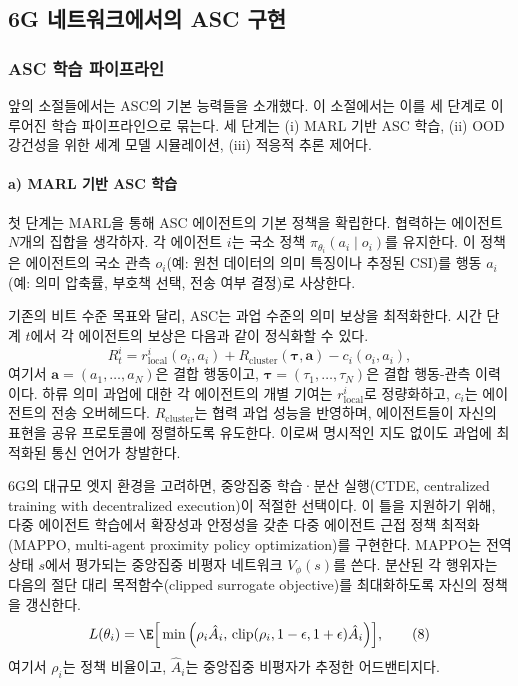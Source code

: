 \subsection{6G 네트워크에서의 ASC 구현}

\subsubsection{ASC 학습 파이프라인}
앞의 소절들에서는 ASC의 기본 능력들을 소개했다. 이 소절에서는 이를 세 단계로 이루어진 학습 파이프라인으로 묶는다. 세 단계는 (i) MARL 기반 ASC 학습, (ii) OOD 강건성을 위한 세계 모델 시뮬레이션, (iii) 적응적 추론 제어다.

\paragraph{a) MARL 기반 ASC 학습}
첫 단계는 MARL을 통해 ASC 에이전트의 기본 정책을 확립한다. 협력하는 에이전트 $N$개의 집합을 생각하자. 각 에이전트 $i$는 국소 정책 $\pi_{\theta_i}(a_i \mid o_i)$를 유지한다. 이 정책은 에이전트의 국소 관측 $o_i$(예: 원천 데이터의 의미 특징이나 추정된 CSI)를 행동 $a_i$(예: 의미 압축률, 부호책 선택, 전송 여부 결정)로 사상한다.

기존의 비트 수준 목표와 달리, ASC는 과업 수준의 의미 보상을 최적화한다. 시간 단계 $t$에서 각 에이전트의 보상은 다음과 같이 정식화할 수 있다.
\begin{equation}
R_t^i = r_{\mathrm{local}}^i(o_i, a_i) + R_{\mathrm{cluster}}(\bm{\tau}, \mathbf{a}) - c_i(o_i, a_i), \tag{7}
\end{equation}
여기서 $\mathbf{a} = (a_1, \ldots, a_N)$은 결합 행동이고, $\bm{\tau} = (\tau_1, \ldots, \tau_N)$은 결합 행동-관측 이력이다. 하류 의미 과업에 대한 각 에이전트의 개별 기여는 $r_{\mathrm{local}}^i$로 정량화하고, $c_i$는 에이전트의 전송 오버헤드다. $R_{\mathrm{cluster}}$는 협력 과업 성능을 반영하며, 에이전트들이 자신의 표현을 공유 프로토콜에 정렬하도록 유도한다. 이로써 명시적인 지도 없이도 과업에 최적화된 통신 언어가 창발한다.

6G의 대규모 엣지 환경을 고려하면, 중앙집중 학습·분산 실행(CTDE, centralized training with decentralized execution)이 적절한 선택이다. 이 틀을 지원하기 위해, 다중 에이전트 학습에서 확장성과 안정성을 갖춘 다중 에이전트 근접 정책 최적화(MAPPO, multi-agent proximity policy optimization)를 구현한다. MAPPO는 전역 상태 $s$에서 평가되는 중앙집중 비평자 네트워크 $V_\phi(s)$를 쓴다. 분산된 각 행위자는 다음의 절단 대리 목적함수(clipped surrogate objective)를 최대화하도록 자신의 정책을 갱신한다.
\begin{equation}
L(\theta_i) = \E\Big[\min\Big(\rho_i \hat{A}_i,\, \mathrm{clip}(\rho_i, 1-\epsilon, 1+\epsilon)\hat{A}_i\Big)\Big], \tag{8}
\end{equation}
여기서 $\rho_i$는 정책 비율이고, $\hat{A}_i$는 중앙집중 비평자가 추정한 어드밴티지다.


